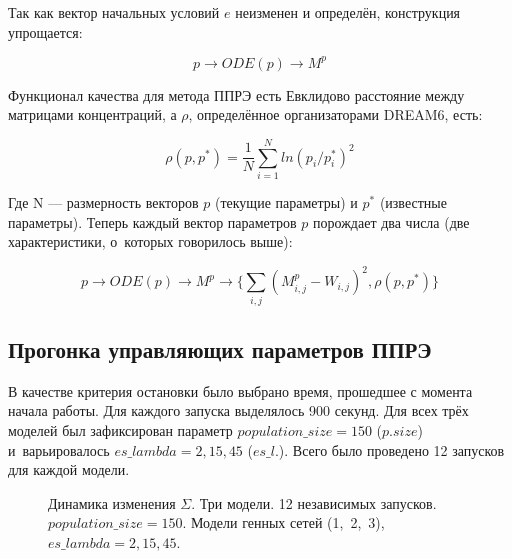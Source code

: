 Так как вектор начальных условий $e$ неизменен и определён, конструкция 
упрощается:

\[ p \rightarrow ODE(p) \rightarrow M^p \]

Функционал качества для метода ППРЭ есть Евклидово расстояние между матрицами 
концентраций, а $\rho$, определённое организаторами DREAM6, есть:

\[ \rho(p,p^*) = \frac{1}{N} \sum\limits_{i = 1}^{N} ln(p_i/p^*_i)^2 \]

Где N — размерность векторов $p$ (текущие параметры) и $p^*$ (известные 
параметры). Теперь каждый вектор параметров $p$ порождает два числа (две 
характеристики, о~которых говорилось выше):

\[ 
p \rightarrow ODE(p) \rightarrow M^p 
\rightarrow \{ \sum\limits_{i,j}(M_{i,j}^p - W_{i,j})^2 , \rho(p,p^*) \}
\]

\subsection{Прогонка управляющих параметров ППРЭ} \label{s3_2}

В качестве критерия остановки было выбрано время, прошедшее с момента начала 
работы. Для каждого запуска выделялось 900 секунд. 
Для всех трёх моделей был зафиксирован параметр $population\_size = 150$ 
($p.size$) и~варьировалось $es\_lambda = 2,15,45$ ($es\_l.$). Всего было 
проведено 12 запусков для каждой модели. 
\begin{figure}[h]
  \center{\texttt{[image: p150]}}
  \caption{Динамика изменения $\Sigma$. Три модели. 12 независимых запусков. 
  $population\_size = 150$. Модели генных сетей (1,~2,~3), 
  $es\_lambda = 2, 15, 45$.}
  \label{img:p150}
\end{figure}
\clearpage

